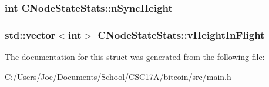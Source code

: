 \subsubsection[{n\+Sync\+Height}]{\setlength{\rightskip}{0pt plus 5cm}int C\+Node\+State\+Stats\+::n\+Sync\+Height}\label{struct_c_node_state_stats_a7646deac801098e973a5bc50202f92cd}
\hypertarget{struct_c_node_state_stats_a4b03fd8ecaa9268f7eca836e5e79c35a}{}
\subsubsection[{v\+Height\+In\+Flight}]{\setlength{\rightskip}{0pt plus 5cm}std\+::vector$<$int$>$ C\+Node\+State\+Stats\+::v\+Height\+In\+Flight}\label{struct_c_node_state_stats_a4b03fd8ecaa9268f7eca836e5e79c35a}


The documentation for this struct was generated from the following file\+:\begin{DoxyCompactItemize}
\item 
C\+:/\+Users/\+Joe/\+Documents/\+School/\+C\+S\+C17\+A/bitcoin/src/\hyperlink{main_8h}{main.\+h}\end{DoxyCompactItemize}
